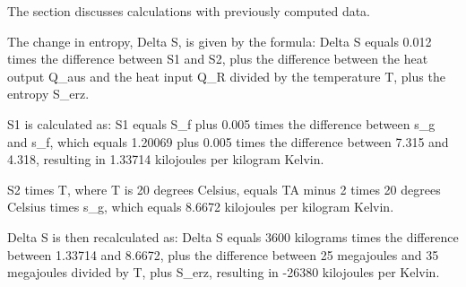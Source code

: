 The section discusses calculations with previously computed data.

The change in entropy, Delta S, is given by the formula:
Delta S equals 0.012 times the difference between S1 and S2, plus the difference between the heat output Q_aus and the heat input Q_R divided by the temperature T, plus the entropy S_erz.

S1 is calculated as:
S1 equals S_f plus 0.005 times the difference between s_g and s_f, which equals 1.20069 plus 0.005 times the difference between 7.315 and 4.318, resulting in 1.33714 kilojoules per kilogram Kelvin.

S2 times T, where T is 20 degrees Celsius, equals TA minus 2 times 20 degrees Celsius times s_g, which equals 8.6672 kilojoules per kilogram Kelvin.

Delta S is then recalculated as:
Delta S equals 3600 kilograms times the difference between 1.33714 and 8.6672, plus the difference between 25 megajoules and 35 megajoules divided by T, plus S_erz, resulting in -26380 kilojoules per Kelvin.
